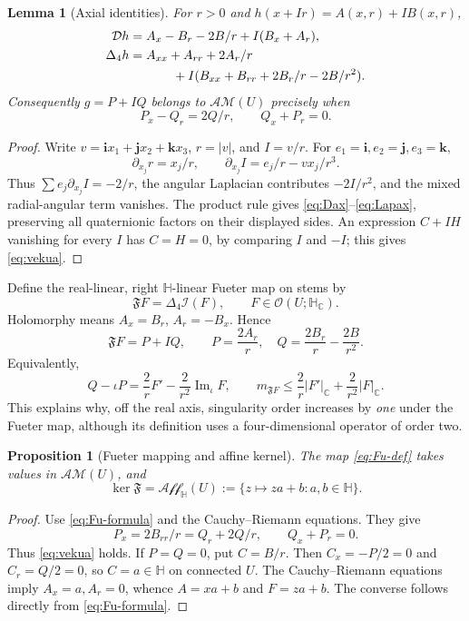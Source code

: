 \documentclass[11pt,a4paper]{article}
\numberwithin{equation}{section}
\newtheorem{proposition}[theorem]{Proposition}
\newtheorem{lemma}[theorem]{Lemma}
\theoremstyle{definition}
\theoremstyle{remark}
\newcommand{\C}{\mathbb C}
\newcommand{\HH}{\mathbb H}
\newcommand{\HC}{\mathbb H_{\C}}
\newcommand{\ii}{\mathbf i}
\newcommand{\jj}{\mathbf j}
\newcommand{\kk}{\mathbf k}
\newcommand{\D}{\mathcal D}
\newcommand{\Lap}{\Delta_4}
\newcommand{\Ind}{\mathcal I}
\newcommand{\Fu}{\mathfrak F}
\newcommand{\AM}{\mathcal{AM}}
\newcommand{\Hol}{\mathcal O}
\newcommand{\Aff}{\mathcal{Aff}_{\HH}}
\newcommand{\ImC}{\operatorname{Im}_{\iota}}
\newcommand{\cnorm}[1]{\lvert #1\rvert_{\C}}
\begin{document}
\begin{lemma}[Axial identities]\label{lem:axial}
For $r>0$ and $h(x+Ir)=A(x,r)+IB(x,r)$,
\begin{align}
 \D h&=A_x-B_r-2B/r+I(B_x+A_r),\label{eq:Dax}\\
 \Lap h&=A_{xx}+A_{rr}+2A_r/r\notag\\
 &\hspace{12mm}+I(B_{xx}+B_{rr}+2B_r/r-2B/r^2).
 \label{eq:Lapax}
\end{align}
Consequently $g=P+IQ$ belongs to $\AM(U)$ precisely when
\begin{equation}\label{eq:vekua}
 P_x-Q_r=2Q/r,\qquad Q_x+P_r=0.
\end{equation}
\end{lemma}
\begin{proof}
Write $v=\ii x_1+\jj x_2+\kk x_3$, $r=|v|$, and $I=v/r$.
For $e_1=\ii,e_2=\jj,e_3=\kk$,
\[
 \partial_{x_j}r=x_j/r,\qquad
 \partial_{x_j}I=e_j/r-vx_j/r^3.
\]
Thus $\sum e_j\partial_{x_j}I=-2/r$, the angular Laplacian contributes
$-2I/r^2$, and the mixed radial-angular term vanishes.
The product rule gives \eqref{eq:Dax}--\eqref{eq:Lapax}, preserving all
quaternionic factors on their displayed sides. An expression $C+IH$
vanishing for every $I$ has $C=H=0$, by comparing $I$ and $-I$; this gives
\eqref{eq:vekua}.
\end{proof}

Define the real-linear, right $\HH$-linear Fueter map on stems by
\begin{equation}\label{eq:Fu-def}
 \Fu F=\Lap\Ind(F),\qquad F\in\Hol(U;\HC).
\end{equation}
Holomorphy means $A_x=B_r$, $A_r=-B_x$. Hence
\begin{equation}\label{eq:Fu-formula}
 \Fu F=P+IQ,\qquad P=\frac{2A_r}{r},\quad
 Q=\frac{2B_r}{r}-\frac{2B}{r^2}.
\end{equation}
Equivalently,
\begin{equation}\label{eq:Fu-first}
 Q-\iota P=\frac2r F'-\frac2{r^2}\ImC F,
 \qquad
 m_{\Fu F}\le\frac2r\cnorm{F'}+\frac2{r^2}\cnorm F.
\end{equation}
This explains why, off the real axis, singularity order increases by
\emph{one} under the Fueter map, although its definition uses a
four-dimensional operator of order two.

\begin{proposition}[Fueter mapping and affine kernel]\label{prop:Fu}
The map \eqref{eq:Fu-def} takes values in $\AM(U)$, and
\begin{equation}\label{eq:kernel}
 \ker\Fu=\Aff(U):=\{z\mapsto za+b:a,b\in\HH\}.
\end{equation}
\end{proposition}
\begin{proof}
Use \eqref{eq:Fu-formula} and the Cauchy--Riemann equations. They give
\[
 P_x=2B_{rr}/r=Q_r+2Q/r,\qquad Q_x+P_r=0.
\]
Thus \eqref{eq:vekua} holds. If $P=Q=0$, put $C=B/r$.
Then $C_x=-P/2=0$ and $C_r=Q/2=0$, so $C=a\in\HH$ on connected $U$.
The Cauchy--Riemann equations imply $A_x=a,A_r=0$, whence $A=xa+b$ and
$F=za+b$. The converse follows directly from \eqref{eq:Fu-formula}.
\end{proof}
\end{document}
